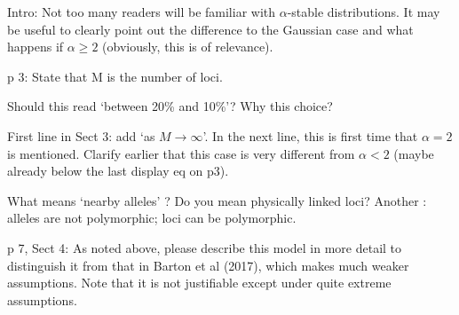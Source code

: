 \begin{point}{}
Intro: Not too many readers will be familiar with $\alpha$-stable distributions. It may be
useful to clearly point out the difference to the Gaussian case and what happens if $\alpha \ge 2$
(obviously, this is of relevance).
\end{point}


\begin{point}{}
p 3: State that M is the number of loci.
\end{point}


\begin{point}{\revref}
Should this read ‘between 20\% and 10\%’? Why this choice?
\end{point}


\begin{point}{\revref}
First line in Sect 3: add ‘as $M \to \infty$’. In the next line, this is first time that $\alpha = 2$ is
mentioned. Clarify earlier that this case is very different from $\alpha < 2$ (maybe already below
the last display eq on p3).
\end{point}


\begin{point}{\revref}
What means ‘nearby alleles’ ? Do you mean physically linked
    loci? Another : alleles are not polymorphic; loci can be polymorphic.
\end{point}


\begin{point}{}
p 7, Sect 4: As noted above, please describe this model in more detail to distinguish it
from that in Barton et al (2017), which makes much weaker assumptions. Note that it is
not justifiable except under quite extreme assumptions.
\end{point}

